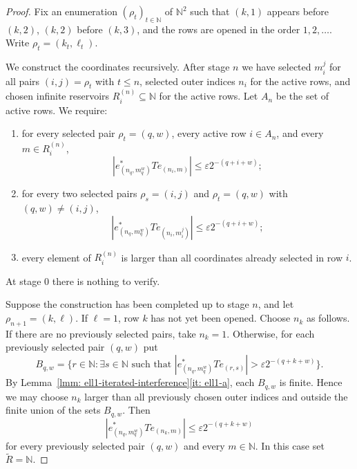 \documentclass[11pt]{amsart}
\theoremstyle{plain}
\theoremstyle{definition}
\numberwithin{equation}{section}
\newcommand{\N}{\mathbb{N}}
\renewcommand{\leq}{\leqslant}
\begin{document}
\begin{proof}
    Fix an enumeration $(\rho_t)_{t\in\N}$ of $\N^2$ such that $(k,1)$ appears before $(k,2)$, $(k,2)$ before $(k,3)$, and the rows are opened in the order $1,2,\dots$. Write $\rho_t=(k_t,\ell_t)$.

    We construct the coordinates recursively. After stage $n$ we have selected $m_i^j$ for all pairs $(i,j)=\rho_t$ with $t\leq n$, selected outer indices $n_i$ for the active rows, and chosen infinite reservoirs $R_i^{(n)}\subseteq\N$ for the active rows. Let $A_n$ be the set of active rows. We require:
    \begin{enumerate}[label=(\roman*), ref=(\roman*)]
        \item \label{it: ell1-true-invariant-reservoir} for every selected pair $\rho_t=(q,w)$, every active row $i\in A_n$, and every $m\in R_i^{(n)}$,
        \begin{equation*}
            |e^*_{(n_q,m_q^w)}T e_{(n_i,m)}|
            \leq \varepsilon 2^{-(q+i+w)};
        \end{equation*}
        \item \label{it: ell1-iterated-true-diagonal-ii} for every two selected pairs $\rho_s=(i,j)$ and $\rho_t=(q,w)$ with $(q,w)\neq(i,j)$,
        \begin{equation*}
            |e^*_{(n_q,m_q^w)}T e_{(n_i,m_i^j)}|
            \leq \varepsilon 2^{-(q+i+w)};
        \end{equation*}
        \item every element of $R_i^{(n)}$ is larger than all coordinates already selected in row $i$.
    \end{enumerate}
    At stage $0$ there is nothing to verify.

    Suppose the construction has been completed up to stage $n$, and let $\rho_{n+1}=(k,\ell)$. If $\ell=1$, row $k$ has not yet been opened. Choose $n_k$ as follows. If there are no previously selected pairs, take $n_k=1$. Otherwise, for each previously selected pair $(q,w)$ put
    \begin{equation*}
        B_{q,w}=\{r\in\N: \exists s\in\N \text{ such that } |e^*_{(n_q,m_q^w)}T e_{(r,s)}|>\varepsilon2^{-(q+k+w)}\}.
    \end{equation*}
    By Lemma~\ref{lmm: ell1-iterated-interference}\ref{it: ell1-a}, each $B_{q,w}$ is finite. Hence we may choose $n_k$ larger than all previously chosen outer indices and outside the finite union of the sets $B_{q,w}$. Then
    \begin{equation}\label{eq: ell1-new-row-old-targets}
        |e^*_{(n_q,m_q^w)}T e_{(n_k,m)}|
        \leq \varepsilon2^{-(q+k+w)}
    \end{equation}
    for every previously selected pair $(q,w)$ and every $m\in\N$. In this case set $\widetilde R=\N$.


\end{proof}
\end{document}
